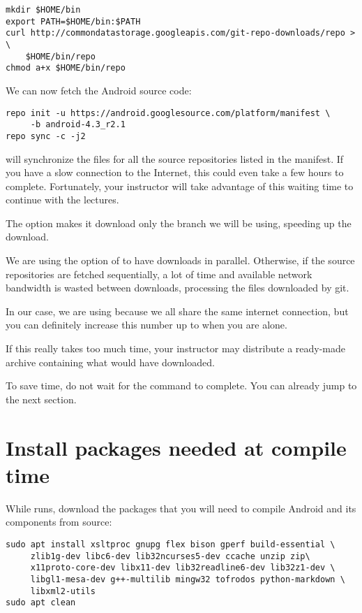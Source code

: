 \begin{verbatim}
mkdir $HOME/bin
export PATH=$HOME/bin:$PATH
curl http://commondatastorage.googleapis.com/git-repo-downloads/repo > \
    $HOME/bin/repo
chmod a+x $HOME/bin/repo
\end{verbatim}

We can now fetch the Android source code:

\begin{verbatim}
repo init -u https://android.googlesource.com/platform/manifest \
     -b android-4.3_r2.1
repo sync -c -j2
\end{verbatim}

 will synchronize the files for all the source
repositories listed in the manifest. If you have a slow connection to
the Internet, this could even take a few hours to
complete. Fortunately, your instructor will take advantage of this
waiting time to continue with the lectures.

The  option makes it download only the branch we will be
using, speeding up the download.

We are using the  option of  to have 
downloads in parallel. Otherwise, if the source repositories are fetched
sequentially, a lot of time and available network bandwidth is wasted
between downloads, processing the files downloaded by git.

In our case, we are using  because we all share the same
internet connection, but you can definitely increase this number up to
\code{8} when you are alone.

If this really takes too much time, your instructor may distribute a
ready-made archive containing what  would have
downloaded.

To save time, do not wait for the  command to
complete. You can already jump to the next section.

\section{Install packages needed at compile time}

While  runs, download the packages that you will need
to compile Android and its components from source:

\begin{verbatim}
sudo apt install xsltproc gnupg flex bison gperf build-essential \
     zlib1g-dev libc6-dev lib32ncurses5-dev ccache unzip zip\
     x11proto-core-dev libx11-dev lib32readline6-dev lib32z1-dev \
     libgl1-mesa-dev g++-multilib mingw32 tofrodos python-markdown \
     libxml2-utils
sudo apt clean
\end{verbatim}

